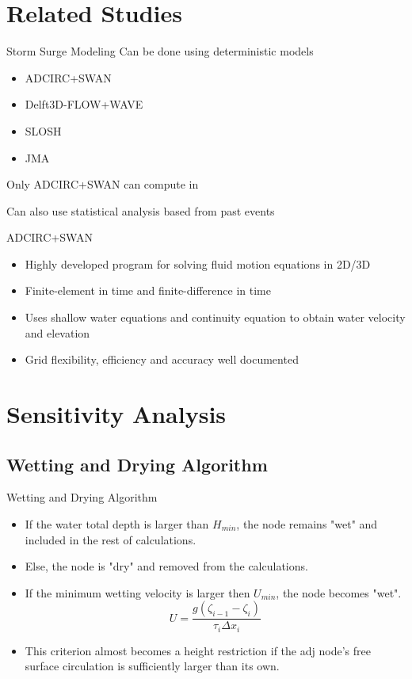 \documentclass[10pt]{beamer}
\begin{document}
\section{Related Studies}
\begin{frame}{Storm Surge Modeling}
	Can be done using deterministic models
	\begin{itemize}
		\item<1-> ADCIRC+SWAN
		\item<1-> Delft3D-FLOW+WAVE
		\item<1-> SLOSH
		\item<1-> JMA
	\end{itemize}
	Only ADCIRC+SWAN can compute in 
	
	Can also use statistical analysis based from past events
\end{frame}
\begin{frame}{ADCIRC+SWAN}
	\begin{itemize}
		\item Highly developed program for solving fluid motion equations in 2D/3D
		\item Finite-element in time and finite-difference in time
		\item Uses shallow water equations and continuity equation to obtain water velocity and elevation
		\item Grid flexibility, efficiency and accuracy well documented
	\end{itemize}
\end{frame}

\section{Sensitivity Analysis}
\subsection{Wetting and Drying Algorithm}
\begin{frame}{Wetting and Drying Algorithm}{}
  \begin{itemize}
    \item<1-> If the water total depth is larger than $H_{min}$, the node remains "wet" and included in the rest of calculations.
    \item<1-> Else, the node is "dry" and removed from the calculations.
    \item<2-> If the minimum wetting velocity is larger then $U_{min}$, the node becomes "wet".
    \begin{equation*}
    U = \frac{g\left(\zeta_{i-1} - \zeta_i\right)}{\tau_i \Delta x_i}
    \end{equation*}
    \item<3-> This criterion almost becomes a height restriction if the adj node's free surface circulation is sufficiently larger than its own.
  \end{itemize}
\end{frame}
\end{document}
